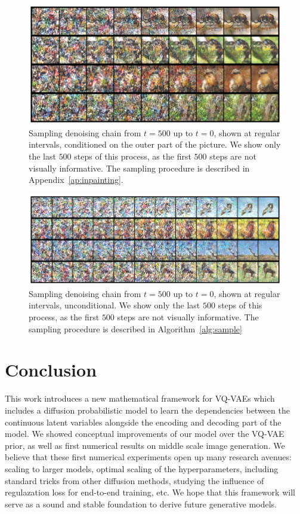 \documentclass[nolayout]{article}
\theoremstyle{plain}
\theoremstyle{definition}
\theoremstyle{remark}
\begin{document}
\begin{figure}
    \centering
    \includegraphics[width=1\linewidth]{images/ours/chains2.png}
    \caption{Sampling denoising chain from $t=500$ up to $t=0$, shown at regular intervals, conditioned on the outer part of the picture. We show only the last $500$ steps of this process, as the first $500$ steps are not visually informative. The sampling procedure is described in Appendix~\ref{ap:inpainting}.}
    \label{fig:miniimagenet_prior_ours_chain}
\end{figure}


\begin{figure}
    \centering
    \includegraphics[width=1\linewidth]{images/ours/chains_unconditional.png}
    \caption{Sampling denoising chain from $t=500$ up to $t=0$, shown at regular intervals, unconditional. We show only the last $500$ steps of this process, as the first $500$ steps are not visually informative. The sampling procedure is described in Algorithm~\ref{alg:sample}}
    \label{fig:miniimagenet_prior_ours_chain_unconditional}
\end{figure}



\section{Conclusion}
This work introduces a new mathematical framework for VQ-VAEs which includes a diffusion probabilistic model to learn the dependencies between the continuous latent  variables alongside the encoding and decoding part of the model. We showed conceptual improvements of our model over the VQ-VAE prior, as well as first numerical results on middle scale image generation. We believe that these first numerical experiments open up many research avenues: scaling to larger models, optimal scaling of the hyperparameters, including standard tricks from other diffusion methods, studying the influence of regulazation loss for end-to-end training, etc. We hope that this framework will serve as a sound and stable foundation to derive future generative models.
\end{document}
